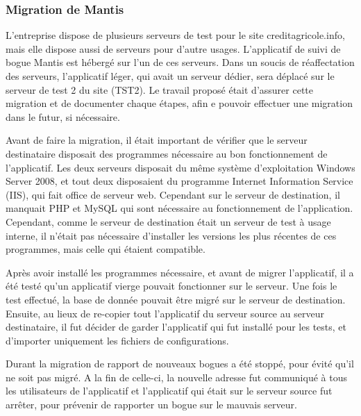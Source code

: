 \documentclass[12pt,a4paper]{article}
\begin{document}
\subsubsection{Migration de Mantis}
L'entreprise dispose de plusieurs serveurs de test pour le site creditagricole.info, mais elle dispose aussi de serveurs pour d'autre usages. L'applicatif de suivi de bogue Mantis est hébergé sur l'un de ces serveurs. Dans un soucis de réaffectation des serveurs, l'applicatif léger, qui avait un serveur dédier, sera déplacé sur le serveur de test 2 du site (TST2). Le travail proposé était d'assurer cette migration et de documenter chaque étapes, afin e pouvoir effectuer une migration dans le futur, si nécessaire.\par 
Avant de faire la migration, il était important de vérifier que le serveur destinataire disposait des programmes nécessaire au bon fonctionnement de l'applicatif. Les deux serveurs disposait du même système d'exploitation Windows Server 2008, et tout deux disposaient du programme Internet Information Service (IIS), qui fait office de serveur web. Cependant sur le serveur de destination, il manquait PHP et MySQL qui sont nécessaire au fonctionnement de l'application. Cependant, comme le serveur de destination était un serveur de test à usage interne, il n'était pas nécessaire d'installer les versions les plus récentes de ces programmes, mais celle qui étaient compatible.\par 
Après avoir installé les programmes nécessaire, et avant de migrer l'applicatif, il a été testé qu'un applicatif vierge pouvait fonctionner sur le serveur. Une fois le test effectué, la base de donnée pouvait être migré sur le serveur de destination. Ensuite, au lieux de re-copier tout l'applicatif du serveur source au serveur destinataire, il fut décider de garder l'applicatif qui fut installé pour les tests, et d'importer uniquement les fichiers de configurations.\par 
Durant la migration de rapport de nouveaux bogues a été stoppé, pour évité qu'il ne soit pas migré. A la fin de celle-ci, la nouvelle adresse fut communiqué à tous les utilisateurs de l'applicatif et l'applicatif qui était sur le serveur source fut arrêter, pour prévenir de rapporter un bogue sur le mauvais serveur.\par
\end{document}
